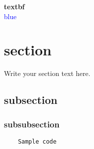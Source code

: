 \documentclass{article}
\begin{document}
    \textbf{textbf}\\

    \textcolor{blue}{blue}

    \section{section}
    Write your section text here.
    \subsection{subsection}
    \subsubsection{subsubsection}

    \begin{verbatim}
    Sample code
    \end{verbatim}

\end{document}
